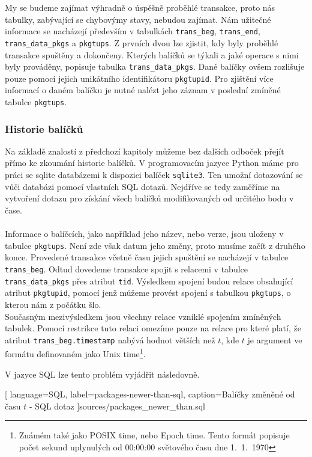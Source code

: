 \documentclass[
  field=inf,
  biblatex,
  glossaries,
  index
]{kidiplom}
\begin{document}
		My se budeme zajímat výhradně o úspěšně proběhlé transakce, proto nás tabulky, zabývající se chybovýmy stavy, nebudou zajímat. Nám užitečné informace se nacházejí především v tabulkách \texttt{trans\_beg}, \texttt{trans\_end}, \texttt{trans\_data\_pkgs} a \texttt{pkgtups}. Z prvních dvou lze zjistit, kdy byly proběhlé transakce spuštěny a dokončeny. Kterých balíčků se týkali a jaké operace s nimi byly prováděny, popisuje tabulka \texttt{trans\_data\_pkgs}. Dané balíčky ovšem rozlišuje pouze pomocí jejich unikátního identifikátoru \texttt{pkgtupid}. Pro zjištění více informací o daném balíčku je nutné nalézt jeho záznam v poslední zmíněné tabulce \texttt{pkgtups}.

		\subsubsection{Historie balíčků}
		Na základě znalostí z předchozí kapitoly můžeme bez dalších odboček přejít přímo ke zkoumání historie balíčků. V programovacím jazyce Python máme pro práci se sqlite databázemi k dispozici balíček \texttt{sqlite3}. Ten umožní dotazování se vůči databázi pomocí vlastních SQL dotazů. Nejdříve se tedy zaměříme na vytvoření dotazu pro získání všech balíčků modifikovaných od určitého bodu v čase.
		\\
		\\
		Informace o balíčcích, jako například jeho název, nebo verze, jsou uloženy v tabulce \texttt{pkgtups}. Není zde však datum jeho změny, proto musíme začít z druhého konce. Provedené transakce včetně času jejich spuštění se nacházejí v tabulce \texttt{trans\_beg}. Odtud dovedeme transakce spojit s relacemi v tabulce \texttt{trans\_data\_pkgs} přes atribut \texttt{tid}. Výsledkem spojení budou relace obsahující atribut \texttt{pkgtupid}, pomocí jenž můžeme provést spojení s tabulkou \texttt{pkgtups}, o kterou nám z počátku šlo.
		\\
		Současným mezivýsledkem jsou všechny relace vzniklé spojením zmíněných tabulek. Pomocí restrikce tuto relaci omezíme pouze na relace pro které platí, že atribut \texttt{trans\_beg.timestamp} nabývá hodnot větších než $t$, kde $t$ je argument ve formátu definovaném jako Unix time\footnote{Známém také jako POSIX time, nebo Epoch time. Tento formát popisuje počet sekund uplynulých od 00:00:00 světového času dne 1.~1.~1970}.

		V jazyce SQL lze tento problém vyjádřit následovně.

		
		[
			language=SQL,
			label=packages-newer-than-sql,
			caption={Balíčky změněné od času $t$ - SQL dotaz}
		]{sources/packages_newer_than.sql}
\end{document}
